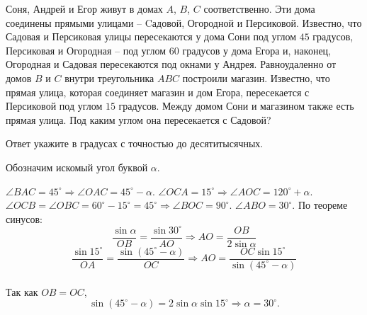 
Соня, Андрей и Егор живут в домах $A$, $B$, $C$ соответственно. Эти дома соединены прямыми улицами -- Cадовой, Огородной и Персиковой. Известно, что Садовая и Персиковая улицы пересекаются у дома Сони под углом $45$ градусов, Персиковая и Огородная -- под углом $60$ градусов у дома Егора и, наконец, Огородная и Садовая пересекаются под окнами у Андрея. Равноудаленно от домов $B$ и $C$ внутри треугольника $ABC$ построили магазин. Известно, что прямая улица, которая соединяет магазин и дом Егора, пересекается с Персиковой под углом $15$ градусов. Между домом Сони и магазином также есть прямая улица. Под каким углом она пересекается с Садовой?

Ответ укажите в градусах с точностью до десятитысячных.

\solutionSection

Обозначим искомый угол буквой $\alpha$. 


$\angle BAC = 45^\circ \Rightarrow \angle OAC = 45^\circ - \alpha$. 
$\angle OCA = 15^\circ \Rightarrow \angle AOC = 120^\circ + \alpha$. \linebreak
$\angle OCB = \angle OBC = 60^\circ - 15^\circ = 45^\circ \Rightarrow \angle BOC = 90^\circ$. 
$\angle ABO = 30^\circ$. По теореме синусов:
$$\frac{\sin\alpha}{OB} = \frac{\sin 30^\circ}{AO} \Rightarrow AO = \frac{OB}{2\sin\alpha}$$
$$\frac{\sin 15^\circ}{OA} = \frac{\sin (45^\circ - \alpha)}{OC} \Rightarrow AO = \frac{OC\sin 15^\circ}{\sin (45^\circ - \alpha)}$$ \\

Так как $OB = OC$, 
$$\sin (45^\circ - \alpha) = 2\sin\alpha \sin 15^\circ \Rightarrow \alpha = 30^\circ.$$

